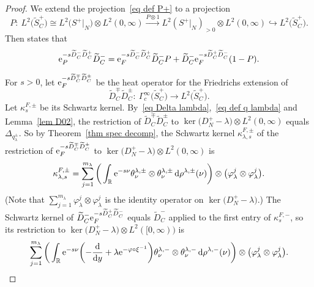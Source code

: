 \documentclass[pdftex]{sigma}%
\numberwithin{equation}{section}
\newcommand{\R}{\mathbb{R}}
\begin{document}
\begin{proof}
We extend the projection~\eqref{eq def P+} to a projection
\[
P \colon\ L^2\big(\widetilde{S}_C^+\big) \cong L^2\big(S^+|_N\big) \otimes L^2(0,\infty)
 \xrightarrow{P \otimes 1} L^2(S^+|_N)_{>0} \otimes L^2 (0,\infty)\hookrightarrow L^2\big(\widetilde{S}_C^+\big).
\]
Then \cite[Proposition~3.5]{HW21a} states that
\begin{equation} \label{eq decomp eP eF}
{\rm e}_P^{-s\widetilde{D}_C^-\widetilde{D}_C^+}\widetilde{D}_C^- = {\rm e}_F^{-s\widetilde{D}_C^-\widetilde{D}_C^+}\widetilde{D}_C^- P + \widetilde{D}_C^-{\rm e}_F^{-s\widetilde{D}_C^+\widetilde{D}_C^-}(1-P).
\end{equation}

 For $s>0$, let ${\rm e}_F^{-s \widetilde{D}_C^{\mp} \widetilde{D}_C^{\pm}}$ be the heat operator for the Friedrichs extension of
\[
\widetilde{D}_C^{\mp} \widetilde{D}_C^{\pm}\colon\ \Gamma^{\infty}_c\big(\widetilde{S}_C^+\big) \to L^2\big(\widetilde{S}_C^+\big).
\]
Let $\kappa_s^{F, \pm}$ be its Schwartz kernel.
By~\eqref{eq Delta lambda},~\eqref{eq def q lambda} and Lemma~\ref{lem D02}, the restriction of $\widetilde{D}_C^{\mp} \widetilde{D}_C^{\pm}$ to $\ker\big(D_N^+ - \lambda\big) \otimes L^2(0,\infty)$ equals $\Delta_{q_{\lambda}^{\pm}}$. So by Theorem~\ref{thm spec decomp}, the Schwartz kernel $\kappa_{\lambda, s}^{F, \pm}$ of the restriction of ${\rm e}_F^{-s \widetilde{D}_C^{\mp} \widetilde{D}_C^{\pm}}$ to $\ker\big(D_N^+ - \lambda\big) \otimes L^2(0, \infty)$ is
\[
\kappa_{\lambda, s}^{F, \pm} =
\sum_{j=1}^{m_{\lambda}}\bigg(\int_{\R}{\rm e}^{-s\nu} \theta^{\lambda, \pm}_{\nu}\otimes \theta^{\lambda, \pm}_{\nu} \, {\rm d}\rho^{\lambda, \pm}(\nu)\bigg) \otimes \big(\varphi_{\lambda}^j \otimes \varphi_{\lambda}^j \big).
\]
\big(Note that $\sum_{j=1}^{m_{\lambda}} \varphi_{\lambda}^j \otimes \varphi_{\lambda}^j$ is the identity operator on $\ker\big(D_N^+ - \lambda\big)$.\big)
The Schwartz kernel of $\widetilde{D}_C^- {\rm e}_F^{-s \widetilde{D}_C^{+}\widetilde{D}_C^-}$ equals $\widetilde{D}_C^-$ applied to the first entry of $\kappa_s^{F, -}$, so its restriction to $\ker\big(D_N^+ - \lambda\big) \otimes L^2([0, \infty))$ is
\begin{equation} \label{eq D kappa F lambda}
\sum_{j=1}^{m_{\lambda}}\bigg(\int_{\R}
{\rm e}^{-s\nu} \biggl( - \frac{\rm d}{{\rm d}y}+\lambda {\rm e}^{-\varphi \circ \xi^{-1}}\biggr) \theta^{\lambda, -}_{\nu}\otimes \theta^{\lambda, -}_{\nu} \, {\rm d}\rho^{\lambda, -}(\nu)\bigg) \otimes \big(\varphi_{\lambda}^j \otimes \varphi_{\lambda}^j \big).

\end{equation}
\end{proof}
\end{document}
